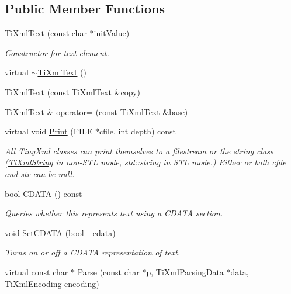 \subsection*{Public Member Functions}
\begin{DoxyCompactItemize}
\item 
\hyperlink{class_ti_xml_text_af659e77c6b87d684827f35a8f4895960}{TiXmlText} (const char $\ast$initValue)
\begin{DoxyCompactList}\small\item\em Constructor for text element. \end{DoxyCompactList}\item 
virtual \hyperlink{class_ti_xml_text_a829a4bd2d8d2461c333eb4f3f5b1b3d2}{$\sim$TiXmlText} ()
\item 
\hyperlink{class_ti_xml_text_a8d2cc1b4af2208cbb0171cf20f6815d1}{TiXmlText} (const \hyperlink{class_ti_xml_text}{TiXmlText} \&copy)
\item 
\hyperlink{class_ti_xml_text}{TiXmlText} \& \hyperlink{class_ti_xml_text_aed5b13f9c1b804c616fd533882c29f57}{operator=} (const \hyperlink{class_ti_xml_text}{TiXmlText} \&base)
\item 
virtual void \hyperlink{class_ti_xml_text_ae74d56c5b3ddec6cc3103dd51821af92}{Print} (FILE $\ast$cfile, int depth) const 
\begin{DoxyCompactList}\small\item\em All TinyXml classes can print themselves to a filestream or the string class (\hyperlink{class_ti_xml_string}{TiXmlString} in non-\/STL mode, std::string in STL mode.) Either or both cfile and str can be null. \end{DoxyCompactList}\item 
bool \hyperlink{class_ti_xml_text_ad1a6a6b83fa2271022dd97c072a2b586}{CDATA} () const 
\begin{DoxyCompactList}\small\item\em Queries whether this represents text using a CDATA section. \end{DoxyCompactList}\item 
void \hyperlink{class_ti_xml_text_acb17ff7c5d09b2c839393445a3de5ea9}{SetCDATA} (bool \_\-cdata)
\begin{DoxyCompactList}\small\item\em Turns on or off a CDATA representation of text. \end{DoxyCompactList}\item 
virtual const char $\ast$ \hyperlink{class_ti_xml_text_a8d2dcfa41fc73d3e62dacc2fcf633819}{Parse} (const char $\ast$p, \hyperlink{class_ti_xml_parsing_data}{TiXmlParsingData} $\ast$\hyperlink{bootstrap_8cc_a923b2158227405b9f7a6eceb6c7104c8}{data}, \hyperlink{tinyxml_8h_a88d51847a13ee0f4b4d320d03d2c4d96}{TiXmlEncoding} encoding)

\end{DoxyCompactItemize}
